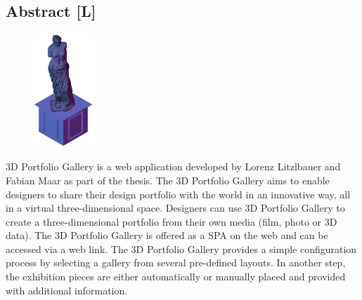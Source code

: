 \begin{spacing}{1}
    \chapter*{Abstract [L]}
\end{spacing}
\begin{figure}
    \begin{center}
      \includegraphics[width=0.2\textwidth]{pics/statue.png}
    \end{center}
\end{figure}
3D Portfolio Gallery is a web application developed by Lorenz Litzlbauer and Fabian Maar as part of the thesis. The 3D Portfolio Gallery aims to enable designers to share their design portfolio with the world in an innovative way, all in a virtual three-dimensional space. Designers can use 3D Portfolio Gallery to create a three-dimensional portfolio from their own media (film, photo or 3D data).
The 3D Portfolio Gallery is offered as a SPA on the web and can be accessed via a web link.
The 3D Portfolio Gallery provides a simple configuration process by selecting a gallery from several pre-defined layouts. In another step, the exhibition pieces are either automatically or manually placed and provided with additional information.

